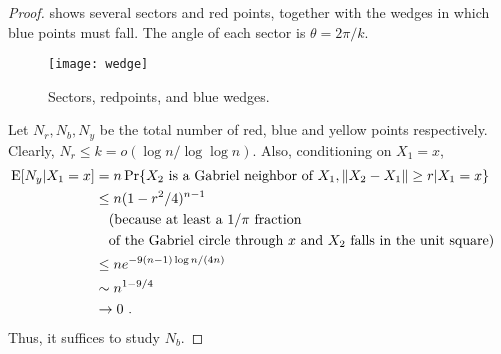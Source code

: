 \documentclass[lotsofwhite,charterfonts]{patmorin}
\newcommand{\PROB}{\Pr}
\newcommand{\EXP}{\mathrm{E}}
\begin{document}
\begin{proof}
shows several sectors and red points, together
with the wedges in which blue points must
fall. The angle of each sector is $\theta = 2\pi / k$.

\begin{figure}
  \begin{center}
    \texttt{[image: wedge]}
  \end{center}
  \caption{Sectors, redpoints, and blue wedges.}
\end{figure}

Let $N_r , N_b, N_y$ be the total number of red, blue and yellow
points respectively.
Clearly, $N_r \le k = o(\log n /\log \log n)$.
Also, conditioning on $X_1 = x$,
\[
\begin{aligned}
\EXP [N_y | X_1 = x] 
&= n \PROB \{ X_2 ~\hbox{\rm is a Gabriel neighbor of}~ X_1 , \| X_2 - X_1 \| \ge r | X_1 = x \} \cr
&\le n (1-r^2/4)^{n-1} \cr
&\quad \hbox{\rm (because at least a $1/\pi$ fraction} \cr
&\quad \hbox{\rm of the Gabriel circle through $x$ and $X_2$ falls in the unit square)} \cr
&\le n e^{-9(n-1) \log n / (4 n)} \cr
&\sim n^{1-9/4} \cr
&\to 0~. \cr
\end{aligned}
\]
Thus, it suffices to study $N_b$.


\end{proof}
\end{document}
